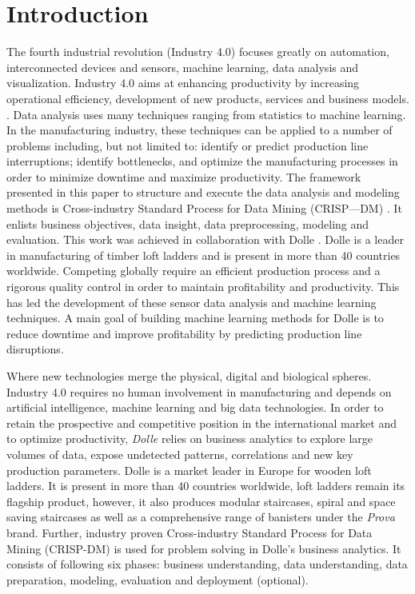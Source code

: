 \documentclass[runningheads]{llncs}
\begin{document}
\section{Introduction}
The fourth industrial revolution (Industry 4.0) focuses greatly on automation, interconnected devices and sensors, machine learning, data analysis and visualization. Industry 4.0 aims at enhancing productivity by increasing operational efficiency, development of new products, services and business models. \cite{industry}. 
Data analysis uses many techniques ranging from statistics to machine learning. In the manufacturing industry, these techniques can be applied to a number  of problems including, but not limited to: identify or predict production line interruptions; identify bottlenecks, and optimize the manufacturing processes in order to minimize downtime and maximize productivity. The framework presented in this paper to structure and execute the data analysis and modeling methods is Cross-industry Standard Process for Data Mining (CRISP—DM) \cite{CRM}. 
It enlists business objectives, data insight, data preprocessing, modeling and evaluation. This work was achieved in collaboration with Dolle \cite{Dolle}. 
Dolle is a leader in manufacturing of timber loft ladders and is present in more than 40 countries worldwide. Competing globally require an efficient production process and a rigorous quality control in order to maintain profitability and productivity. This has led the development of these sensor data analysis and machine learning techniques. A main goal of building machine learning methods for Dolle is to reduce downtime and improve profitability by predicting production line disruptions.



\iffalse
 Where new technologies merge the physical, digital and biological spheres. Industry 4.0 requires no human involvement in manufacturing and depends on artificial intelligence, machine learning and big data technologies. In order to retain the prospective and competitive position in the international market and to optimize productivity, \textit{Dolle} \cite{Dolle} relies on business analytics to explore large volumes of data, expose undetected patterns, correlations and new key production parameters. Dolle is a market leader in Europe for wooden loft ladders. It is present in more than 40 countries worldwide, loft ladders remain its flagship product, however, it also produces modular staircases, spiral and space saving staircases as well as a comprehensive range of banisters under the \textit{Prova} brand. Further, industry proven Cross-industry Standard Process for Data Mining (CRISP-DM) \cite{CRM} is used for problem solving in Dolle's business analytics. It consists of following six phases: business understanding, data understanding, data preparation, modeling, evaluation and deployment (optional). 
\end{document}

